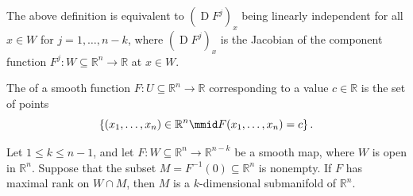 \documentclass[notoc,notitlepage]{tufte-book}
\DeclareMathOperator{\D}{D}
\begin{document}
\begin{note}
  The above definition is equivalent to $(\D F^j)_x$ being linearly independent
  for all $x \in W$ for $j = 1, \ldots, n - k$, where $(\D F^j)_x$ is the
  Jacobian of the component function $F^j : W \subseteq \mathbb{R}^n \to
  \mathbb{R}$ at $x \in W$.
\end{note}

\begin{defn}\label{defn:level_set}
  The  of a smooth function $F : U \subseteq \mathbb{R}^n \to
  \mathbb{R}$  corresponding to a value
  $c \in \mathbb{R}$ is the set of points \cite{weisstein-mathworld}
  \begin{equation*}
    \left\{ (x_1, \ldots, x_n) \in \mathbb{R}^n \mmid F(x_1, \ldots, x_n) = c
    \right\}.
  \end{equation*}
\end{defn}

\begin{thm}\label{thm:implicit_submanifold_theorem}
  Let $1 \leq k \leq n - 1$, and let $F : W \subseteq \mathbb{R}^n \to
  \mathbb{R}^{n - k}$ be a smooth map, where $W$ is open in $\mathbb{R}^n$.
  Suppose that the subset $M = F^{-1}(0) \subseteq \mathbb{R}^n$ is nonempty. If
  $F$ has maximal rank on $W \cap M$, then $M$ is a $k$-dimensional submanifold
  of $\mathbb{R}^n$.
\end{thm}
\end{document}
